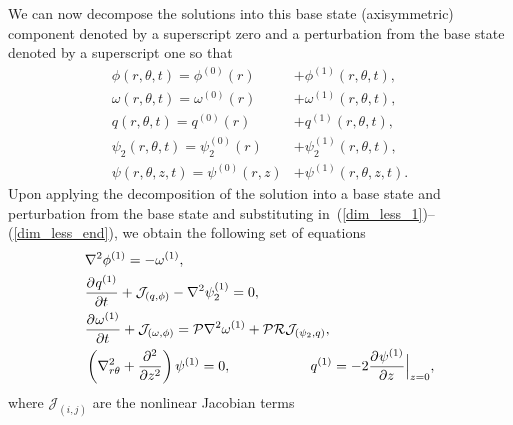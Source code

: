 We can now decompose the solutions into this base state (axisymmetric) component denoted by a superscript zero and a perturbation from the base state denoted by a superscript one so that
\begin{subequations}
\begin{align}
\phi(r,\theta,t)   = \phi^{(0)}(r)   &+ \phi^{(1)}(r,\theta,t),\\
\omega(r,\theta,t) = \omega^{(0)}(r) &+ \omega^{(1)}(r,\theta,t),\\
q(r,\theta,t)      = q^{(0)}(r)      &+ q^{(1)}(r,\theta,t),\\
\psi_2(r,\theta,t) = \psi_2^{(0)}(r) &+ \psi_2^{(1)}(r,\theta,t),\\
\psi(r,\theta,z,t) = \psi^{(0)}(r,z) &+ \psi^{(1)}(r,\theta,z,t).
\end{align}
\end{subequations}
Upon applying the decomposition of the solution into a base state and perturbation from the base state and substituting in~(\ref{dim_less_1})--(\ref{dim_less_end}), we obtain the following set of equations
\begin{subequations}
\begin{align}
\label{pert_1} &\nabla^2 \phi^{(1)} = -\omega^{(1)},\\
&\pderiv[]{q^{(1)}}{t} + \mathcal{J}_{(q,\phi)} - \nabla^2\psi_2^{(1)} = 0, \\
&\pderiv[]{\omega^{(1)}}{t} + \mathcal{J_{(\omega,\phi)}} = \mathcal{P} \nabla^2\omega^{(1)} + \mathcal{PR}\mathcal{J}_{(\psi_2,q)},\\
\label{pert_end} &\left(\nabla^2_{r\theta} + \pderiv[2]{}{z} \right)\psi^{(1)} = 0, \hspace{2cm}
q^{(1)} = -2\pderiv[]{\psi^{(1)}}{z}\Big{|}_{z=0},
\end{align}
\end{subequations}
where $\mathcal{J}_{(i,j)}$ are the nonlinear Jacobian terms
